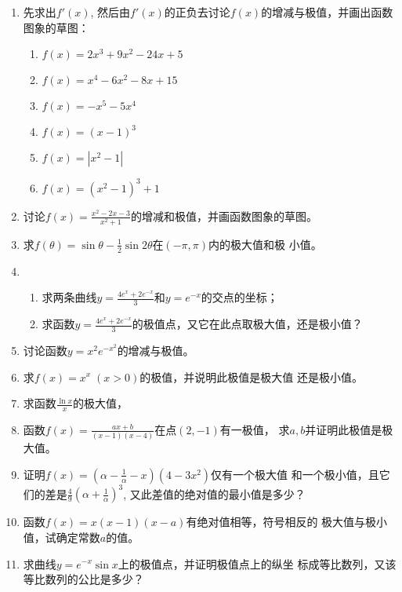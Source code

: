 \begin{ex}
\begin{enumerate}
    \item 先求出$f'(x)$, 然后由$f'(x)$的正负去讨论$f(x)$的增减与极值，并画出函数图象的草图：
\begin{multicols}{2}
    \begin{enumerate}
        \item $f (x) =2x^3+9x^2-24x+5$
        \item $f (x) =x^4-6x^2-8x+15$
        \item $f (x) =-x^5-5x^4$
        \item $f (x) = (x-1)^3$
     \item  $f (x) =|x^2-1|$
     \item $f (x) = (x^2-1)^3+1$
    \end{enumerate}
\end{multicols}
\item 讨论$f(x)=\frac{x^2-2x-3}{x^2+1}$的增减和极值，并画函数图象的草图。
    \item 求$f(\theta)=\sin\theta-\frac{1}{2}\sin2\theta$在$(-\pi,\pi)$内的极大值和极
    小值。
    \item 
\begin{enumerate}
    \item 求两条曲线$y=\frac{4e^x+2e^{-x}}{3}$和$y=e^{-x}$的交点的坐标；
    \item 求函数$y=\frac{4e^x+2e^{-x}}{3}$的极值点，又它在此点取极大值，还是极小值？
\end{enumerate}

\item 讨论函数$y=x^2e^{-x^2}$的增减与极值。
\item 求$f(x)=x^x\; (x>0)$的极值，并说明此极值是极大值
还是极小值。
\item 求函数$\frac{\ln x}{x}$的极大值，

\item 函数$f(x)=\frac{ax+b}{(x-1)(x-4)}$在点$(2,-1)$有一极值，
求$a,b$并证明此极值是极大值。
\item 证明$f(x)=\left(\alpha-\frac{1}{\alpha}-x\right)(4-3x^2)$仅有一个极大值
和一个极小值，且它们的差是$\frac{4}{9}\left(\alpha+\frac{1}{\alpha}\right)^3$, 又此差值的绝对值的最小值是多少？
\item 函数$f(x)=x(x-1)(x-a)$有绝对值相等，符号相反的
极大值与极小值，试确定常数$a$的值。
\item 求曲线$y=e^{-x}\sin x$上的极值点，并证明极值点上的纵坐
标成等比数列，又该等比数列的公比是多少？  
\end{enumerate} 
\end{ex}


